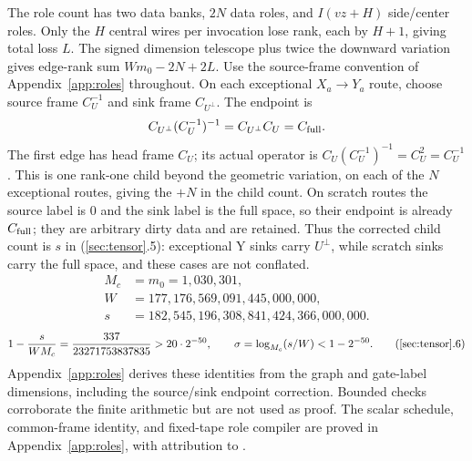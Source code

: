 The role count has two data banks, $2N$ data roles, and $I(vz+H)$ side/center roles. Only the $H$ central wires per invocation lose rank, each by $H+1$, giving total loss $L$. The signed dimension telescope plus twice the downward variation gives edge-rank sum $Wm_0-2N+2L$. Use the source-frame convention of Appendix~\ref{app:roles} throughout. On each exceptional $X_a\to Y_a$ route, choose source frame $C_U^{-1}$ and sink frame $C_{U^\perp}$. The endpoint is
\[
 C_{U^\perp}(C_U^{-1})^{-1}=C_{U^\perp}C_U=C_{\rm full}.
\]
The first edge has head frame $C_U$; its actual operator is $C_U(C_U^{-1})^{-1}=C_U^2=C_U^{-1}$. This is one rank-one child beyond the geometric variation, on each of the $N$ exceptional routes, giving the $+N$ in the child count. On scratch routes the source label is $0$ and the sink label is the full space, so their endpoint is already $C_{\rm full}$; they are arbitrary dirty data and are retained. Thus the corrected child count is $s$ in (\ref{sec:tensor}.5): exceptional Y sinks carry $U^\perp$, while scratch sinks carry the full space, and these cases are not conflated.
\begin{align*}
 M_c&=m_0=1{,}030{,}301,\\
 W&=177{,}176{,}569{,}091{,}445{,}000{,}000,\\
 s&=182{,}545{,}196{,}308{,}841{,}424{,}366{,}000{,}000.
\end{align*}
\[
 1-\frac{s}{W M_c}=\frac{337}{23271753837835}>20\cdot2^{-50},
 \qquad \sigma=\log_{M_c}(s/W)<1-2^{-50}.
 \tag{\ref{sec:tensor}.6}
\]
Appendix~\ref{app:roles} derives these identities from the graph and gate-label dimensions, including the source/sink endpoint correction. Bounded checks corroborate the finite arithmetic but are not used as proof. The scalar schedule, common-frame identity, and fixed-tape role compiler are proved in Appendix~\ref{app:roles}, with attribution to \cite{OpenAI26}.

